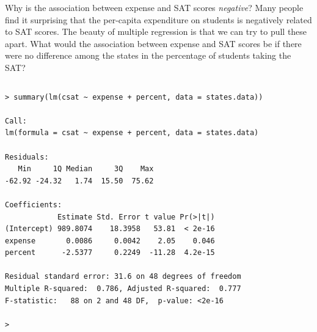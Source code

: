 \documentclass[table,smaller]{beamer}
\begin{document}
\begin{frame}[fragile,label=sec-2-4]{Why is the association between expense and SAT scores \emph{negative}?}
 Many people find it surprising that the per-capita expenditure on students is negatively related to SAT scores. The beauty of multiple regression is that we can try to pull these apart. What would the association between expense and SAT scores be if there were no difference among the states in the percentage of students taking the SAT?

\vspace{-.5em}
\begin{columns}
\begin{block}{}
\begin{verbatim}
> summary(lm(csat ~ expense + percent, data = states.data))

Call:
lm(formula = csat ~ expense + percent, data = states.data)

Residuals:
   Min     1Q Median     3Q    Max 
-62.92 -24.32   1.74  15.50  75.62 

Coefficients:
            Estimate Std. Error t value Pr(>|t|)
(Intercept) 989.8074    18.3958   53.81  < 2e-16
expense       0.0086     0.0042    2.05    0.046
percent      -2.5377     0.2249  -11.28  4.2e-15

Residual standard error: 31.6 on 48 degrees of freedom
Multiple R-squared:  0.786,	Adjusted R-squared:  0.777 
F-statistic:   88 on 2 and 48 DF,  p-value: <2e-16

>
\end{verbatim}
\end{block}
\end{columns}
\vspace{.5em}
\end{frame}
\end{document}
